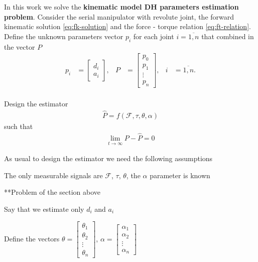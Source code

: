 In this work we solve the \textbf{kinematic model DH parameters estimation problem}. Consider the serial manipulator with revolute joint, the forward kinematic solution \eqref{eq:fk-solution} and the force - torque relation \eqref{eq:ft-relation}. Define the unknown parameters vector $p_i$ for each joint $i = \overline{1, n}$ that combined in the vector $P$
\begin{align}
    p_i & =
    \begin{bmatrix}
        d_i \\ a_i
    \end{bmatrix}, &
    P & =
    \begin{bmatrix}
        p_0 \\ p_1 \\ \vdots \\ p_n
    \end{bmatrix}, &
    i & = \overline{1, n}.
\end{align} \\
Design the estimator
\begin{align}
\hat{P} = f(\mathcal{F}, \tau, \theta, \alpha)
\end{align}
such that
\begin{align}
    \lim_{t\to\infty} {P - \hat{P}} = 0
\end{align}

As usual to design the estimator we need the following assumptions
\begin{assumption}
    The only measurable signals are $\mathcal{F}$, $\tau$, $\theta$, the $\alpha$ parameter is known
\end{assumption}

{\color{red} **Problem of the section above}

{\color{red} Say that we estimate only $d_i$ and $a_i$}

{\color{red} Define the vectors $\theta = \begin{bmatrix} \theta_1 \\ \theta_2 \\ \vdots \\ \theta_n \end{bmatrix}$, $\alpha = \begin{bmatrix} \alpha_1 \\ \alpha_2 \\ \vdots \\ \alpha_n \end{bmatrix}$}
